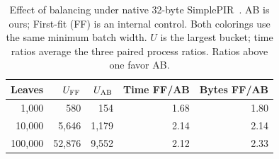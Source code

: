 \begin{table}[t]
\centering\footnotesize
\caption{Effect of balancing under native 32-byte SimplePIR~\cite{simplepir}. AB is ours; First-fit (FF) is an internal control. Both colorings use the same minimum batch width. $U$ is the largest bucket; time ratios average the three paired process ratios. Ratios above one favor AB.}
\label{tab:native-ablation}
\setlength{\tabcolsep}{3.2pt}
\begin{tabular}{rrrrr}\toprule
Leaves & $U_{\rm FF}$ & $U_{\rm AB}$ & Time FF/AB & Bytes FF/AB\\\midrule
1,000 & 580 & 154 & 1.68 & 1.80 \\
10,000 & 5,646 & 1,179 & 2.14 & 2.14 \\
100,000 & 52,876 & 9,552 & 2.12 & 2.33 \\
\bottomrule\end{tabular}
\end{table}

